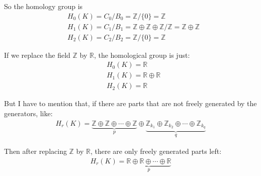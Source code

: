 \documentclass[]{ctexart}
\begin{document}
		So the homology group is
			\begin{equation*}
			\begin{aligned}
				&H_0(K)=C_0/B_0=\mathbb{Z}/\{0\}=\mathbb{Z}\\
				&H_1(K)=C_1/B_1=\mathbb{Z}\oplus\mathbb{Z}\oplus\mathbb{Z}/\mathbb{Z}=\mathbb{Z}\oplus\mathbb{Z}\\
				&H_2(K)=C_2/B_2=\mathbb{Z}/\{0\}=\mathbb{Z}
			\end{aligned}
			\end{equation*}
			
		If we replace the field $\mathbb{Z}$ by $\mathbb{R}$, the homological group is just:
			\begin{equation*}
			\begin{aligned}
				&H_0(K)=\mathbb{R}\\
				&H_1(K)=\mathbb{R}\oplus\mathbb{R}\\
				&H_2(K)=\mathbb{R}
			\end{aligned}
			\end{equation*}	
			
		But I have to mention that, if there are parts that are not freely generated by the generators, like:
			\begin{equation*}
			\begin{aligned}
				H_r(K)=\underbrace{\mathbb{Z}\oplus\mathbb{Z}\oplus\cdots \oplus\mathbb{Z}}_{p}\oplus\underbrace{\mathbb{Z}_{k_1}\oplus\mathbb{Z}_{k_2}\oplus\cdots \oplus\mathbb{Z}_{k_q}}_{q}
			\end{aligned}
			\end{equation*}
			
		Then after replacing $\mathbb{Z}$ by $\mathbb{R}$, there are only freely generated parts left:
			\begin{equation*}
			\begin{aligned}
				H_r(K)=\underbrace{\mathbb{R}\oplus\mathbb{R}\oplus\cdots \oplus\mathbb{R}}_{p}
			\end{aligned}
			\end{equation*}
	
\end{document}
